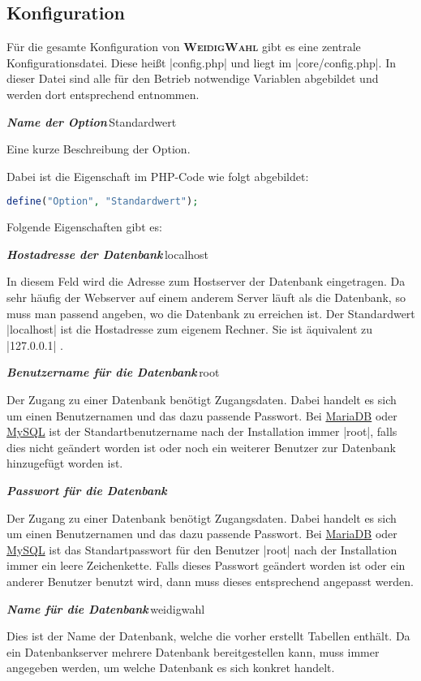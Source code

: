 \documentclass[ngerman]{ltxdoc}
\newcommand{\DescribeOption}[4]{
  \DescribeMacro{#1}
  \begin{minipage}[t]{\textwidth}
    \textit{\textbf{\textcolor{mLightGreen}{#2}}}\dotfill\,#3\par
    \begingroup
    \vspace{0.5em}#4\par
    \endgroup
  \end{minipage}
}
\newcommand{\name}{\textbf{\textsc{WeidigWahl}}\xspace}
\begin{document}
\subsection{Konfiguration}

Für die gesamte Konfiguration von \name gibt es eine zentrale Konfigurationsdatei.
Diese heißt |config.php| und liegt im |core/config.php|. In dieser Datei sind alle
für den Betrieb notwendige Variablen abgebildet und werden dort entsprechend entnommen.

\DescribeOption{Option}{Name der Option}{Standardwert}{
  Eine kurze Beschreibung der Option.
}

Dabei ist die Eigenschaft im PHP-Code wie folgt abgebildet:

\begin{lstlisting}[language=PHP, breaklines=true]
define("Option", "Standardwert");
\end{lstlisting}

Folgende Eigenschaften gibt es:

\DescribeOption{DB\_HOST}{Hostadresse der Datenbank}{localhost}{
  In diesem Feld wird die Adresse zum Hostserver der Datenbank eingetragen. Da
  sehr häufig der Webserver auf einem anderem Server läuft als die Datenbank, so
  muss man passend angeben, wo die Datenbank zu erreichen ist. Der Standardwert
  |localhost| ist die Hostadresse zum eigenem Rechner. Sie ist äquivalent zu
  |127.0.0.1| .
}

\DescribeOption{DB\_USER}{Benutzername für die Datenbank}{root}{
  Der Zugang zu einer Datenbank benötigt Zugangsdaten. Dabei handelt es sich um
  einen Benutzernamen und das dazu passende Passwort. Bei \href{https://mariadb.org/}{MariaDB}
  oder \href{https://www.mysql.com/}{MySQL} ist der Standartbenutzername nach der
  Installation immer |root|, falls dies nicht geändert worden ist oder noch ein
  weiterer Benutzer zur Datenbank hinzugefügt worden ist.
}

\DescribeOption{DB\_PASSWORT}{Passwort für die Datenbank}{\glqq\grqq}{
  Der Zugang zu einer Datenbank benötigt Zugangsdaten. Dabei handelt es sich um
  einen Benutzernamen und das dazu passende Passwort. Bei \href{https://mariadb.org/}{MariaDB}
  oder \href{https://www.mysql.com/}{MySQL} ist das Standartpasswort für den Benutzer
  |root| nach der Installation immer ein leere Zeichenkette. Falls dieses Passwort
  geändert worden ist oder ein anderer Benutzer benutzt wird, dann muss dieses entsprechend
  angepasst werden.
}

\DescribeOption{DB\_NAME}{Name für die Datenbank}{weidigwahl}{
  Dies ist der Name der Datenbank, welche die vorher erstellt Tabellen enthält.
  Da ein Datenbankserver mehrere Datenbank bereitgestellen kann, muss immer angegeben
  werden, um welche Datenbank es sich konkret handelt.
}
\end{document}

